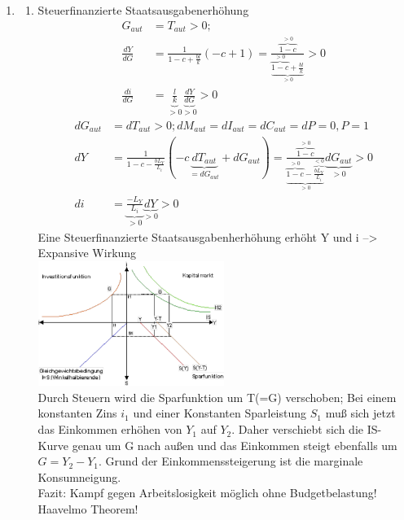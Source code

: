 \documentclass{scrartcl}
\begin{document}
\begin{enumerate}
\item
\begin{enumerate}
  \item Steuerfinanzierte Staatsausgabenerh\"{o}hung
  \begin{align*}
    G_{aut}&=T_{aut}>0;\\
  \frac{dY}{dG} &= \frac{1}{1-c +\frac{b l}{k}} \left(- c +1 \right) = \frac{\overbrace{1-c}^{>0}}{\underbrace{\overbrace{1-c}^{>0} + \frac{b l}{k}}_{>0}} >0\\
  \frac{di}{dG} &= \underbrace{\frac{l}{k}}_{>0} \underbrace{\frac{dY}{dG}}_{>0} >0
  \end{align*}
  \begin{align*}
    dG_{aut}&=dT_{aut}>0; dM_{aut}=dI_{aut}=dC_{aut}=dP=0, P=1\\
  dY &= \frac{1}{1-c -\frac{b L_Y}{L_i}} \left(- c \underbrace{dT_{aut}}_{=dG_{aut}} +dG_{aut} \right) = \frac{\overbrace{1-c}^{>0}}{\underbrace{\overbrace{1-c}^{>0} - \overbrace{\frac{b L_Y}{L_i}}^{<0}}_{>0}} \underbrace{dG_{aut}}_{>0} >0\\
  di &= \underbrace{\frac{-L_Y}{L_i}}_{>0} \underbrace{dY}_{>0} >0
  \end{align*}
  Eine Steuerfinanzierte Staatsausgabenherh\"{o}hung erh\"{o}ht Y und i --> Expansive Wirkung\\
\includegraphics[width=0.5\textwidth]{Bilder/Keynes_IS_LM_Steuerfinanziert.pdf}\\
Durch Steuern wird die Sparfunktion um T(=G) verschoben; Bei einem konstanten Zins $i_1$ und einer Konstanten Sparleistung $S_1$ mu{\ss} sich jetzt das Einkommen erh\"{o}hen von $Y_1$ auf $Y_2$. Daher verschiebt sich die IS-Kurve genau um G nach au{\ss}en und das Einkommen steigt ebenfalls um $G=Y_2-Y_1$. Grund der Einkommenssteigerung ist die marginale Konsumneigung.\\
Fazit: Kampf gegen Arbeitslosigkeit m\"{o}glich ohne Budgetbelastung!
Haavelmo Theorem!


\end{enumerate}
\end{enumerate}
\end{document}
